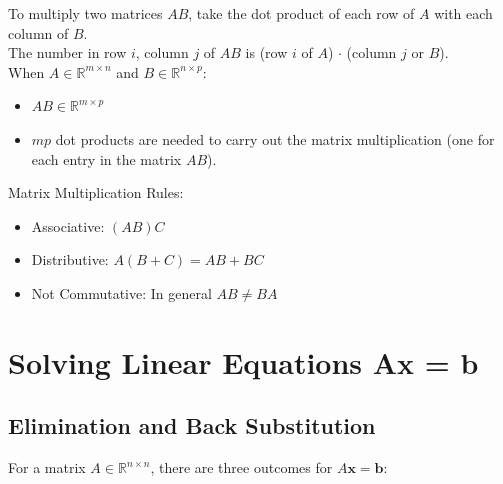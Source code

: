 \documentclass[11pt]{article}
\begin{document}
To multiply two matrices $AB$, take the dot product of each row of $A$ with each column of $B$. \\ 
The number in row $i$, column $j$ of $AB$ is (row $i$ of $A$) $\cdot$ (column $j$ or $B$). \\

When $A \in \mathbb{R}^{m \times n}$ and $B \in \mathbb{R}^{n \times p}$:
\begin{itemize}
    \item  $AB \in \mathbb{R}^{m \times p}$
    \item $mp$ dot products are needed to carry out the matrix multiplication (one for each 
    entry in the matrix $AB$).
\end{itemize}

Matrix Multiplication Rules:
\begin{itemize}
    \item Associative: $(AB)C$
    \item Distributive: $A(B + C) = AB + BC$
    \item Not Commutative: In general $AB \ne BA$
\end{itemize}

\section{Solving Linear Equations Ax = b}

\subsection{Elimination and Back Substitution}

For a matrix $A \in \mathbb{R}^{n \times n}$, there are three outcomes for 
$A\boldsymbol{x} = \boldsymbol{b}$:
\end{document}
